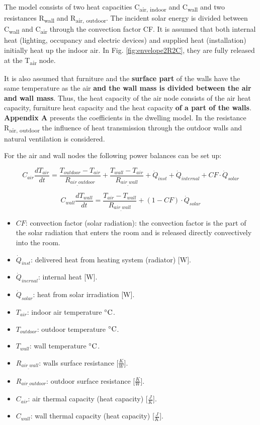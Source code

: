 	
The model consists of two heat capacities C\textsubscript{air, indoor} and C\textsubscript{wall} and two resistances R\textsubscript{wall} and R\textsubscript{air, outdoor}. The incident solar energy is divided between C\textsubscript{wall} and C\textsubscript{air} through the convection factor CF. It is assumed that both internal heat (lighting, occupancy and electric devices) and supplied heat (installation) initially heat up the indoor air. In Fig. \ref{fig:envelope2R2C}, they are fully released at the T\textsubscript{air} node. 

 It is also assumed that furniture and the \textbf{surface part} of the walls have the same temperature as the air \textbf{and the wall mass is divided between the air and wall mass}. Thus, the heat capacity of the air node consists of the air heat capacity, furniture heat capacity and the heat capacity \textbf{of a part of the walls}. \textbf{Appendix A} presents the coefficients in the dwelling model. In the resistance R\textsubscript{air, outdoor} the influence of heat transmission through the outdoor walls and natural ventilation is considered. 
 
For the air and wall nodes the following power balances can be set up: 

\begin{equation}
C_{air}\frac{dT_{air}}{dt}=\frac{T_{outdoor}-T_{air}}{R_{air_{\_}outdoor}} + \frac{T_{wall}-T_{air}}{R_{air_{\_}wall}} + \dot{Q}_{inst} + \dot{Q}_{internal} + CF\cdot\dot{Q}_{solar}
\end{equation}

\begin{equation}
C_{wall}\frac{dT_{wall}}{dt}=\frac{T_{air}-T_{wall}}{R_{air_{\_}wall}} + (1-CF)\cdot\dot{Q}_{solar}
\end{equation}


 \begin{itemize}
      \item $CF$: convection factor (solar radiation): the convection factor is the part of the solar radiation that enters the room and is released directly convectively into the room.
      \item $\dot{Q}_{inst}$: delivered heat from heating system (radiator) [W].
      \item $\dot{Q}_{inernal}$: internal heat [W].
      \item $\dot{Q}_{solar}$: heat from solar irradiation [W].
      \item $T_{air}$: indoor air temperature $^\circ\mathrm{C}$.
      \item $T_{outdoor}$: outdoor temperature $^\circ\mathrm{C}$.
      \item $T_{wall}$: wall temperature $^\circ\mathrm{C}$.
      \item $R_{air_{\_}wall}$: walls surface resistance [$\frac{K}{W}$].
      \item $R_{air_{\_}outdoor}$: outdoor surface resistance [$\frac{K}{W}$].
      \item $C_{air}$: air thermal capacity (heat capacity) [$\frac{J}{K}$]\cite{Thermalmass}.
      \item $C_{wall}$: wall thermal capacity (heat capacity) [$\frac{J}{K}$]\cite{Thermalmass}.
    \end{itemize}


